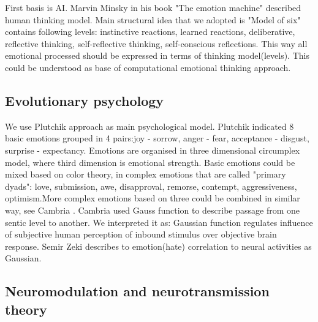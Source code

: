 First basis is  AI. Marvin Minsky in his book "The emotion machine"\cite{emotionmachine} described human thinking model. Main structural idea that we adopted is "Model of six" contains following levels: instinctive reactions, learned reactions, deliberative, reflective thinking, self-reflective thinking, self-conscious reflections. This way all emotional processed should be expressed in terms of thinking model(levels). This could be understood as base of computational emotional thinking approach.

\subsection{Evolutionary psychology}

We use Plutchik approach\cite{natureofemotions} as main psychological model. Plutchik indicated 8 basic emotions grouped in 4 pairs:joy - sorrow, anger - fear, acceptance - disgust, surprise - expectancy.
Emotions are organised in three dimensional circumplex model, where third dimension is emotional strength. Basic emotions could be mixed based on color theory, in complex emotions that are called "primary dyads": love, submission, awe, disapproval, remorse, contempt, aggressiveness, optimism.More complex emotions based on three could be combined in similar way, see Cambria \cite{senticcomputing}. Cambria \cite{hourglass} used Gauss function to describe passage from one sentic level to another. We interpreted it as: Gaussian function regulates influence of subjective human perception of inbound stimulus over objective brain response. Semir Zeki\cite{neuralcorrelatesofhate} describes to emotion(hate) correlation to neural activities as Gaussian.

\subsection{Neuromodulation and neurotransmission theory}

